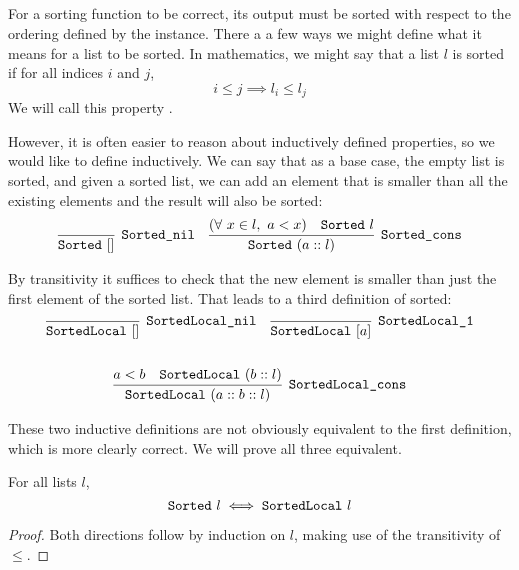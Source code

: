 \documentclass[sigplan,10pt,anonymous,review]{thesis}
\begin{document}
\subsection{}
\label{subsec:sorted}

For a sorting function to be correct, its output must be sorted with
respect to the ordering defined by the  instance. There a
a few ways we might define what it means for a list to be sorted. In
mathematics, we might say that a list $l$ is sorted if for all indices
$i$ and $j$,
\begin{equation*}
  i \le j \implies l_i \le l_j
\end{equation*}
We will call this property .

However, it is often easier to reason about inductively defined
properties, so we would like to define  inductively. We
can say that as a base case, the empty list is sorted, and given a
sorted list, we can add an element that is smaller than all the
existing elements and the result will also be sorted:
\begin{align*}
  \infer[\var{Sorted\_nil}]{\var{Sorted}~[]}{}
  &&
  \infer[\var{Sorted\_cons}]{\var{Sorted}~(a :: l)}{%
    (\forall~x \in l,~a < x) & \var{Sorted}~l
  }
\end{align*}

By transitivity it suffices to check that the new element is
smaller than just the first element of the sorted list. That leads to a third definition of sorted:
\begin{gather*}
  \begin{align*}
    \infer[\var{SortedLocal\_nil}]{\var{SortedLocal}~[]}{}
    &&
    \infer[\var{SortedLocal\_1}]{\var{SortedLocal}~[a]}{}
  \end{align*}
  \\
  \\
  \infer[\var{SortedLocal\_cons}]{\var{SortedLocal}~(a :: b :: l)}{%
    a < b & \var{SortedLocal}~(b :: l)
  }
\end{gather*}

These two inductive definitions are not obviously equivalent to the
first definition, which is more clearly correct. We will prove all
three equivalent.

\begin{theorem}
  For all lists $l$,
  \begin{equation*}
    \texttt{Sorted}~l \iff \texttt{SortedLocal}~l
  \end{equation*}
\end{theorem}
\begin{proof}
  Both directions follow by induction on $l$, making use of the
  transitivity of $\le$.
\end{proof}
\end{document}
